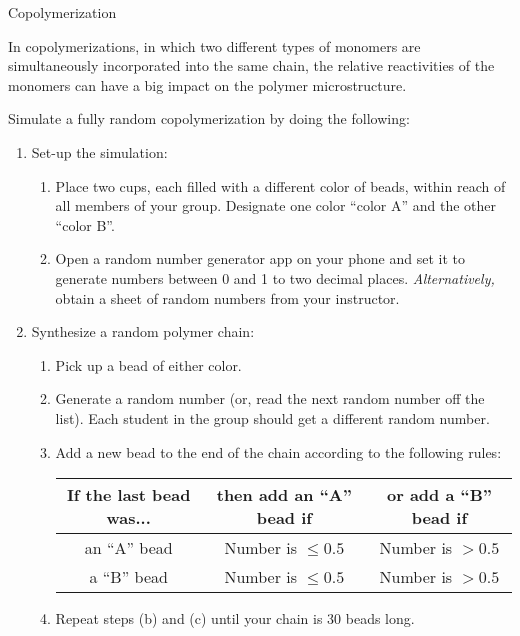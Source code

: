 \begin{activity}{Copolymerization}
\begin{instructornotes}
\end{instructornotes}


\begin{model}
	\label{\labelbase:mdl:simulation}

	In copolymerizations, in which two different types of monomers are simultaneously incorporated into the same chain, the relative reactivities of the monomers can have a big impact on the polymer microstructure.
	
	Simulate a fully random copolymerization by doing the following:
	
	\begin{enumerate}
		\item Set-up the simulation:
			\begin{enumerate}
				\item Place two cups, each filled with a different color of beads, within reach of all members of your group.  Designate one color ``color A'' and the other ``color B''.
				\item Open a random number generator app on your phone and set it to generate numbers between 0 and 1 to two decimal places.  \emph{Alternatively,} obtain a sheet of random numbers from your instructor.
			\end{enumerate}
		\item Synthesize a random polymer chain:
			\begin{enumerate}
				\item Pick up a bead of either color.
				\item Generate a random number (or, read the next random number off the list).  Each student in the group should get a different random number.
				\item Add a new bead to the end of the chain according to the following rules:
					\begin{center}
					\renewcommand{\arraystretch}{1.5}
					\begin{tabular}{|c|c|c|}
						\hline
						\textbf{If the last bead was...} &  \textbf{then add an ``A'' bead if} & \textbf{or add a ``B'' bead if}\\\hline
						 an ``A'' bead & Number is $\leq 0.5$ & Number is $> 0.5$ \\
						 a ``B'' bead & Number is $\leq 0.5$ & Number is $> 0.5$ \\\hline
					\end{tabular}
					\end{center}
				\item Repeat steps (b) and (c) until your chain is 30 beads long.
			\end{enumerate}
	\end{enumerate}
	

\end{model}
\end{activity}
